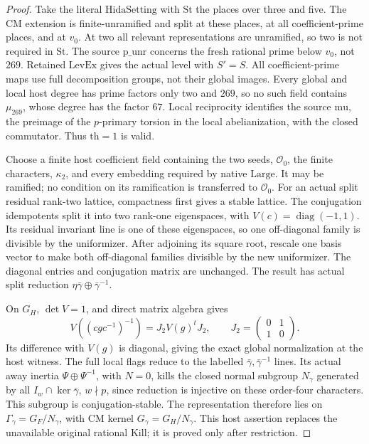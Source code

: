 \begin{proof}
Take the literal \(\mathrm{HidaSetting}\) with
\(\mathrm{St}\) the places over three and five.
The CM extension is finite-unramified and split at these
places, at all coefficient-prime places, and at \(v_0\).
At two all relevant representations are unramified, so two
is not required in \(\mathrm{St}\).  The source
\(\mathrm{p\_unr}\) concerns the fresh rational prime below
\(v_0\), not \(269\).  Retained \(\mathrm{LevEx}\) gives
the actual level with \(S'=S\).  All coefficient-prime maps
use full decomposition groups, not their global images.
Every global and local host degree has prime factors only
two and \(269\), so no such field contains \(\mu_{269}\),
whose degree has the factor \(67\).
Local reciprocity identifies the source \(\mathrm{mu}\),
the preimage of the \(p\)-primary torsion in the local
abelianization, with the closed commutator.  Thus
\(\mathrm{th}=1\) is valid.

Choose a finite host coefficient field containing the two
seeds, \(\mathcal O_0\), the finite characters, \(\kappa_2\),
and every embedding required by native \(\mathrm{Large}\).
It may be ramified; no condition on its ramification is
transferred to \(\mathcal O_0\).
For an actual split residual rank-two lattice, compactness
first gives a stable lattice.  The conjugation idempotents
split it into two rank-one eigenspaces, with
\(V(c)=\operatorname{diag}(-1,1)\).
Its residual invariant line is one of these eigenspaces,
so one off-diagonal family is divisible by the uniformizer.
After adjoining its square root, rescale one basis vector
to make both off-diagonal families divisible by the new
uniformizer.  The diagonal entries and conjugation matrix
are unchanged.  The result has actual split reduction
\(\eta\bar\gamma\oplus\bar\gamma^{-1}\).

On \(G_H\), \(\det V=1\), and direct matrix algebra gives
\[
 V((cgc^{-1})^{-1})=J_2V(g)^tJ_2,
 \qquad J_2=\begin{pmatrix}0&1\\1&0\end{pmatrix}.
 \tag{G136.28}
\]
Its difference with \(V(g)\) is diagonal, giving the exact
global normalization at the host witness.
The full local flags reduce to the labelled
\(\bar\gamma,\bar\gamma^{-1}\) lines.
Its actual away inertia \(\Psi\oplus\Psi^{-1}\), with
\(N=0\), kills the closed normal subgroup \(N_\gamma\)
generated by all \(I_w\cap\ker\bar\gamma\), \(w\nmid p\),
since reduction is injective on these order-four characters.
This subgroup is conjugation-stable.  The representation
therefore lies on \(\Gamma_\gamma=G_F/N_\gamma\), with
CM kernel \(G_\gamma=G_H/N_\gamma\).
This host assertion replaces the unavailable original
rational \(\mathrm{Kill}\); it is proved only after restriction.


\end{proof}
